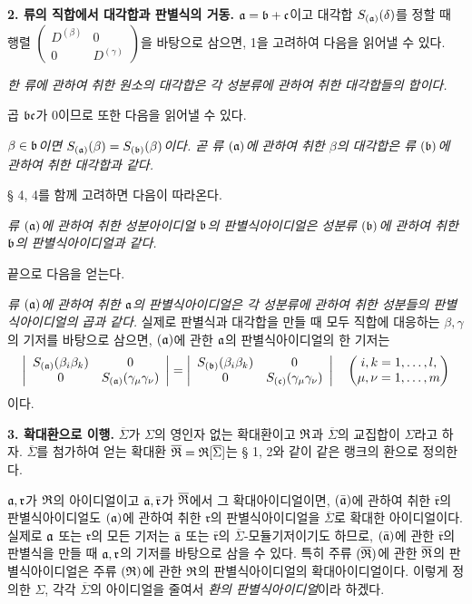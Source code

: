\textbf{2. 류의 직합에서 대각합과 판별식의 거동.} \(\mathfrak{a}=\mathfrak{b}+\mathfrak c\)이고 대각합 \(S_{(\mathfrak{a})}(\delta)\)를 정할 때 행렬 \((\begin{smallmatrix}D^{(\beta)}&0\\0&D^{(\gamma)}\end{smallmatrix})\)을 바탕으로 삼으면, 1을 고려하여 다음을 읽어낼 수 있다.

\emph{한 류에 관하여 취한 원소의 대각합은 각 성분류에 관하여 취한 대각합들의 합이다.}

곱 \(\mathfrak{b}\mathfrak c\)가 0이므로 또한 다음을 읽어낼 수 있다.

\emph{\(\beta\in\mathfrak{b}\)이면 \(S_{(\mathfrak{a})}(\beta)=S_{(\mathfrak{b})}(\beta)\)이다. 곧 류 \((\mathfrak{a})\)에 관하여 취한 \(\beta\)의 대각합은 류 \((\mathfrak{b})\)에 관하여 취한 대각합과 같다.}

§ 4, 4를 함께 고려하면 다음이 따라온다.

\emph{류 \((\mathfrak{a})\)에 관하여 취한 성분아이디얼 \(\mathfrak{b}\)의 판별식아이디얼은 성분류 \((\mathfrak{b})\)에 관하여 취한 \(\mathfrak{b}\)의 판별식아이디얼과 같다.}

끝으로 다음을 얻는다.

\emph{류 \((\mathfrak{a})\)에 관하여 취한 \(\mathfrak{a}\)의 판별식아이디얼은 각 성분류에 관하여 취한 성분들의 판별식아이디얼의 곱과 같다.} 실제로 판별식과 대각합을 만들 때 모두 직합에 대응하는 \(\beta,\gamma\)의 기저를 바탕으로 삼으면, \((\mathfrak{a})\)에 관한 \(\mathfrak{a}\)의 판별식아이디얼의 한 기저는
\[
\left|
\begin{array}{cc}
S_{(\mathfrak{a})}(\beta_i\beta_k)&0\\
0&S_{(\mathfrak{a})}(\gamma_\mu\gamma_\nu)
\end{array}
\right|
=
\left|
\begin{array}{cc}
S_{(\mathfrak{b})}(\beta_i\beta_k)&0\\
0&S_{(\mathfrak c)}(\gamma_\mu\gamma_\nu)
\end{array}
\right|
\quad
\left(
\begin{matrix}
 i,k=1,\ldots,l,\\
\mu,\nu=1,\ldots,m
\end{matrix}
\right)
\]
이다.

\textbf{3. 확대환으로 이행.} \(\overline{\Sigma}\)가 \(\Sigma\)의 영인자 없는 확대환이고 \(\mathfrak{R}\)과 \(\overline{\Sigma}\)의 교집합이 \(\Sigma\)라고 하자. \(\overline{\Sigma}\)를 첨가하여 얻는 확대환 \(\overline{\mathfrak R}=\mathfrak{R}[\overline{\Sigma}]\)는 § 1, 2와 같이 같은 랭크의 환으로 정의한다.

\(\mathfrak{a},\mathfrak r\)가 \(\mathfrak{R}\)의 아이디얼이고 \(\bar{\mathfrak{a}},\bar{\mathfrak r}\)가 \(\overline{\mathfrak R}\)에서 그 확대아이디얼이면, \((\bar{\mathfrak{a}})\)에 관하여 취한 \(\bar{\mathfrak r}\)의 판별식아이디얼도 \((\mathfrak{a})\)에 관하여 취한 \(\mathfrak r\)의 판별식아이디얼을 \(\overline{\Sigma}\)로 확대한 아이디얼이다. 실제로 \(\mathfrak{a}\) 또는 \(\mathfrak r\)의 모든 기저는 \(\bar{\mathfrak{a}}\) 또는 \(\bar{\mathfrak r}\)의 \(\overline{\Sigma}\)-모듈기저이기도 하므로, \((\bar{\mathfrak{a}})\)에 관한 \(\bar{\mathfrak r}\)의 판별식을 만들 때 \(\mathfrak{a},\mathfrak r\)의 기저를 바탕으로 삼을 수 있다. 특히 주류 \((\overline{\mathfrak R})\)에 관한 \(\overline{\mathfrak R}\)의 판별식아이디얼은 주류 \((\mathfrak{R})\)에 관한 \(\mathfrak{R}\)의 판별식아이디얼의 확대아이디얼이다. 이렇게 정의한 \(\Sigma\), 각각 \(\overline{\Sigma}\)의 아이디얼을 줄여서 \emph{환의 판별식아이디얼}이라 하겠다.


